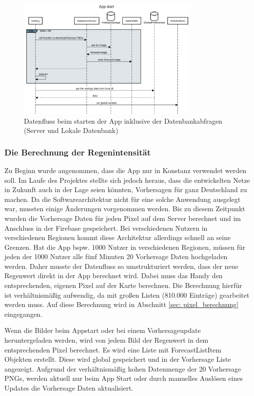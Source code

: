 \begin{figure}[H]
 \centering
 \includegraphics[width=0.8\textwidth,angle=0]{abb/sequence_diagram_app_start}
 \caption[Sequencediagram Appstart]{Datenfluss beim starten der App inklusive der Datenbankabfragen (Server und Lokale Datenbank)}
\label{fig:sequence_diagram_app_start}
\end{figure}

\subsubsection{Die Berechnung der Regenintensität}
Zu Beginn wurde angenommen, dass die App nur in Konstanz verwendet werden soll. 
Im Laufe des Projektes stellte sich jedoch heraus, dass die entwickelten Netze in Zukunft auch in der Lage seien könnten, Vorhersagen 
für ganz Deutschland zu machen. Da die Softwarearchitektur nicht für eine solche Anwendung ausgelegt war, 
mussten einige Änderungen vorgenommen werden. 
Bis zu diesem Zeitpunkt wurden die Vorhersage Daten für jeden Pixel auf dem Server berechnet und im Anschluss in 
der Firebase gespeichert. 
Bei verschiedenen Nutzern in verschiedenen Regionen kommt diese Architektur allerdings schnell an seine Grenzen. 
Hat die App bspw. 1000 Nutzer in verschiedenen Regionen, 
müssen für jeden der 1000 Nutzer alle fünf Minuten 20 Vorhersage Daten hochgeladen werden. 
Daher musste der Datenfluss so umstrukturiert werden, dass der neue Regenwert direkt in der App berechnet wird. 
Dabei muss das Handy den entsprechenden, eigenen Pixel auf der Karte berechnen. 
Die Berechnung hierfür ist verhältnismäßig aufwendig, da mit großen Listen (810.000 Einträge) gearbeitet werden muss.
Auf diese Berechnung wird in Abschnitt \ref{sec: pixel_berechnung} eingegangen. 

Wenn die Bilder beim Appstart oder bei einem Vorhersageupdate heruntergeladen werden, wird von jedem Bild der Regenwert 
in dem entsprechenden Pixel berechnet. 
Es wird eine Liste mit ForecastListItem Objekten erstellt. Diese wird global gespeichert und in der Vorhersage Liste angezeigt. 
Aufgrund der verhältnismäßig hohen Datenmenge der 20 Vorhersage PNGs, werden aktuell nur beim App Start oder durch manuelles Auslösen eines Updates die Vorhersage Daten aktualisiert.

